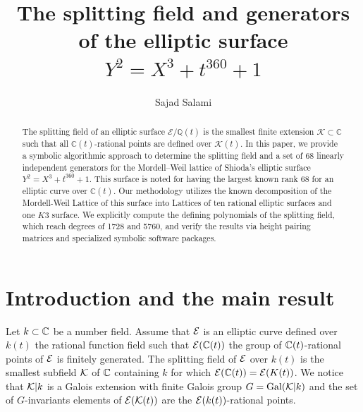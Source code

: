 \documentclass[11pt]{amsart}
\begin{document}
\title{The splitting field and generators of the  elliptic surface  $Y^2=X^3 +t^{360} +1$}

\author{Sajad Salami}
\address{Institute of Mathematics and Statistics, Rio de Janeiro State University, Rio de Janeiro, RJ, Brazil}

\date{}

\newcommand{\I}{{\rm{i}}}


\begin{abstract}
The splitting field of an elliptic surface $\mathcal{E}/\mathbb{Q}(t)$ is the smallest finite extension $\mathcal{K} \subset \mathbb{C}$ such that all $\mathbb{C}(t)$-rational points are defined over $\mathcal{K}(t)$. In this paper, we provide a symbolic algorithmic approach to determine the splitting field and a set of $68$ linearly independent generators for the Mordell--Weil lattice of Shioda's elliptic surface $Y^2=X^3 +t^{360} +1$. This surface is noted for having the largest known rank 68 for an elliptic curve over $\mathbb{C}(t)$.
 Our methodology utilizes the known decomposition of the Mordell-Weil Lattice of this surface into Lattices of    ten rational elliptic surfaces and one $K3$ surface. We explicitly compute the defining polynomials of the splitting field, which reach degrees of 1728 and 5760, and verify the results via height pairing matrices and specialized symbolic software packages.
\end{abstract}
	




\maketitle
 


\section{Introduction and the main result}

Let $k \subset  {\mathbb C}$ be a number field.
Assume that ${\mathcal E}$ is an elliptic curve defined over $k(t)$ the rational function field such that 
${\mathcal E}({\mathbb C}(t))$ the group of   ${\mathbb C}(t)$-rational points of ${\mathcal E}$ is finitely generated.
The {\sf splitting field}
of ${\mathcal E}$ over $k(t)$  is the smallest subfield ${\mathcal K}$ of ${\mathbb C}$ containing $k$ 
for which  ${\mathcal E} ({\mathbb C} (t))={\mathcal E} (K(t))$. 
We notice that  ${\mathcal K}| k$ is a Galois  extension with  finite Galois group  $G={\text{Gal}}({\mathcal K} | k)$
and  the set of $G$-invariants elements of ${\mathcal E} ({\mathcal K}(t))$ are the ${\mathcal E} (k(t))$-rational points.
\end{document}
